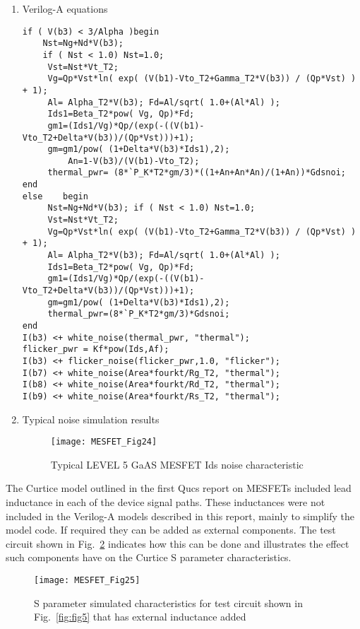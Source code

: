 \begin{enumerate}
 \item Verilog-A equations
\begin{verbatim}
if ( V(b3) < 3/Alpha )begin
	Nst=Ng+Nd*V(b3);
	if ( Nst < 1.0) Nst=1.0;
	 Vst=Nst*Vt_T2;
	 Vg=Qp*Vst*ln( exp( (V(b1)-Vto_T2+Gamma_T2*V(b3)) / (Qp*Vst) ) + 1);
	 Al= Alpha_T2*V(b3); Fd=Al/sqrt( 1.0+(Al*Al) );
	 Ids1=Beta_T2*pow( Vg, Qp)*Fd;
	 gm1=(Ids1/Vg)*Qp/(exp(-((V(b1)-Vto_T2+Delta*V(b3))/(Qp*Vst)))+1);
	 gm=gm1/pow( (1+Delta*V(b3)*Ids1),2); 
         An=1-V(b3)/(V(b1)-Vto_T2);
 	 thermal_pwr= (8*`P_K*T2*gm/3)*((1+An+An*An)/(1+An))*Gdsnoi;
end
else	begin
	 Nst=Ng+Nd*V(b3); if ( Nst < 1.0) Nst=1.0;
	 Vst=Nst*Vt_T2;
	 Vg=Qp*Vst*ln( exp( (V(b1)-Vto_T2+Gamma_T2*V(b3)) / (Qp*Vst) ) + 1);
	 Al= Alpha_T2*V(b3); Fd=Al/sqrt( 1.0+(Al*Al) );
	 Ids1=Beta_T2*pow( Vg, Qp)*Fd;
	 gm1=(Ids1/Vg)*Qp/(exp(-((V(b1)-Vto_T2+Delta*V(b3))/(Qp*Vst)))+1);
	 gm=gm1/pow( (1+Delta*V(b3)*Ids1),2);
	 thermal_pwr=(8*`P_K*T2*gm/3)*Gdsnoi;
end
I(b3) <+ white_noise(thermal_pwr, "thermal"); 
flicker_pwr = Kf*pow(Ids,Af);
I(b3) <+ flicker_noise(flicker_pwr,1.0, "flicker");
I(b7) <+ white_noise(Area*fourkt/Rg_T2, "thermal");
I(b8) <+ white_noise(Area*fourkt/Rd_T2, "thermal");
I(b9) <+ white_noise(Area*fourkt/Rs_T2, "thermal"); 
\end{verbatim} 

\item Typical noise simulation results
\begin{figure} [here]
  \centering
  \texttt{[image: MESFET\_Fig24]}  
  \caption{Typical LEVEL 5 GaAS MESFET Ids noise characteristic}  
  \label{fig:fig24} 
\end{figure} 

\end{enumerate}


The Curtice model outlined in the first Qucs report on MESFETs
included lead inductance in each of the device signal paths. These
inductances were not included in the Verilog-A models described in
this report, mainly to simplify the model code.  If required they can
be added as external components.  The test circuit shown in
Fig.~\ref{fig:fig25} indicates how this can be done and illustrates
the effect such components have on the Curtice S parameter
characteristics.

\begin{figure}  
  \centering
  \texttt{[image: MESFET\_Fig25]}  
  \caption{S parameter simulated characteristics for test circuit shown in Fig.~\ref{fig:fig5} that has external inductance added}  
  \label{fig:fig25} 
\end{figure} 


